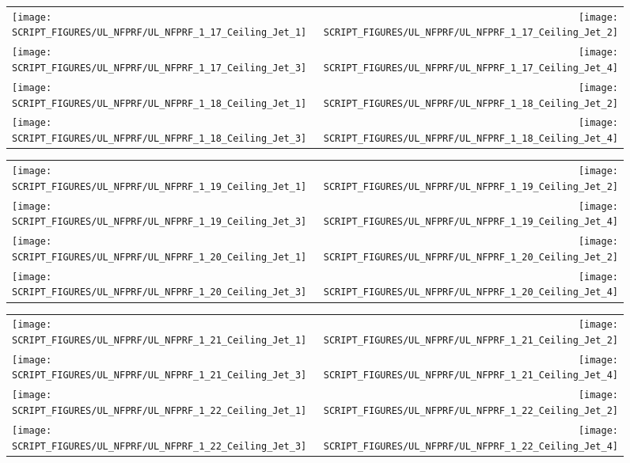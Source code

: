 \begin{figure}[p]
\begin{tabular*}{\textwidth}{l@{\extracolsep{\fill}}r}
\texttt{[image: SCRIPT\_FIGURES/UL\_NFPRF/UL\_NFPRF\_1\_17\_Ceiling\_Jet\_1]} &
\texttt{[image: SCRIPT\_FIGURES/UL\_NFPRF/UL\_NFPRF\_1\_17\_Ceiling\_Jet\_2]} \\
\texttt{[image: SCRIPT\_FIGURES/UL\_NFPRF/UL\_NFPRF\_1\_17\_Ceiling\_Jet\_3]} &
\texttt{[image: SCRIPT\_FIGURES/UL\_NFPRF/UL\_NFPRF\_1\_17\_Ceiling\_Jet\_4]} \\
\texttt{[image: SCRIPT\_FIGURES/UL\_NFPRF/UL\_NFPRF\_1\_18\_Ceiling\_Jet\_1]} &
\texttt{[image: SCRIPT\_FIGURES/UL\_NFPRF/UL\_NFPRF\_1\_18\_Ceiling\_Jet\_2]} \\
\texttt{[image: SCRIPT\_FIGURES/UL\_NFPRF/UL\_NFPRF\_1\_18\_Ceiling\_Jet\_3]} &
\texttt{[image: SCRIPT\_FIGURES/UL\_NFPRF/UL\_NFPRF\_1\_18\_Ceiling\_Jet\_4]}
\end{tabular*}
\end{figure}

\begin{figure}[p]
\begin{tabular*}{\textwidth}{l@{\extracolsep{\fill}}r}
\texttt{[image: SCRIPT\_FIGURES/UL\_NFPRF/UL\_NFPRF\_1\_19\_Ceiling\_Jet\_1]} &
\texttt{[image: SCRIPT\_FIGURES/UL\_NFPRF/UL\_NFPRF\_1\_19\_Ceiling\_Jet\_2]} \\
\texttt{[image: SCRIPT\_FIGURES/UL\_NFPRF/UL\_NFPRF\_1\_19\_Ceiling\_Jet\_3]} &
\texttt{[image: SCRIPT\_FIGURES/UL\_NFPRF/UL\_NFPRF\_1\_19\_Ceiling\_Jet\_4]} \\
\texttt{[image: SCRIPT\_FIGURES/UL\_NFPRF/UL\_NFPRF\_1\_20\_Ceiling\_Jet\_1]} &
\texttt{[image: SCRIPT\_FIGURES/UL\_NFPRF/UL\_NFPRF\_1\_20\_Ceiling\_Jet\_2]} \\
\texttt{[image: SCRIPT\_FIGURES/UL\_NFPRF/UL\_NFPRF\_1\_20\_Ceiling\_Jet\_3]} &
\texttt{[image: SCRIPT\_FIGURES/UL\_NFPRF/UL\_NFPRF\_1\_20\_Ceiling\_Jet\_4]}
\end{tabular*}
\end{figure}

\begin{figure}[p]
\begin{tabular*}{\textwidth}{l@{\extracolsep{\fill}}r}
\texttt{[image: SCRIPT\_FIGURES/UL\_NFPRF/UL\_NFPRF\_1\_21\_Ceiling\_Jet\_1]} &
\texttt{[image: SCRIPT\_FIGURES/UL\_NFPRF/UL\_NFPRF\_1\_21\_Ceiling\_Jet\_2]} \\
\texttt{[image: SCRIPT\_FIGURES/UL\_NFPRF/UL\_NFPRF\_1\_21\_Ceiling\_Jet\_3]} &
\texttt{[image: SCRIPT\_FIGURES/UL\_NFPRF/UL\_NFPRF\_1\_21\_Ceiling\_Jet\_4]} \\
\texttt{[image: SCRIPT\_FIGURES/UL\_NFPRF/UL\_NFPRF\_1\_22\_Ceiling\_Jet\_1]} &
\texttt{[image: SCRIPT\_FIGURES/UL\_NFPRF/UL\_NFPRF\_1\_22\_Ceiling\_Jet\_2]} \\
\texttt{[image: SCRIPT\_FIGURES/UL\_NFPRF/UL\_NFPRF\_1\_22\_Ceiling\_Jet\_3]} &
\texttt{[image: SCRIPT\_FIGURES/UL\_NFPRF/UL\_NFPRF\_1\_22\_Ceiling\_Jet\_4]}
\end{tabular*}
\end{figure}

